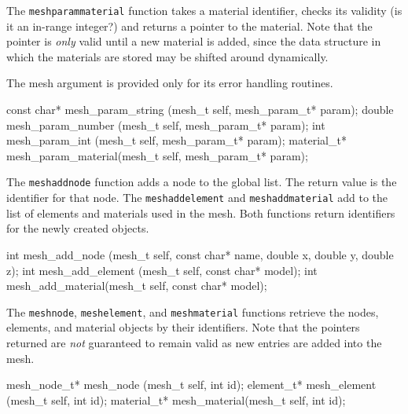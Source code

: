 The {\tt{}mesh{}param{}material} function takes a material identifier,
checks its validity (is it an in-range integer?) and returns a
pointer to the material.  Note that the pointer is \emph{only} valid
until a new material is added, since the data structure in which
the materials are stored may be shifted around dynamically.

The mesh argument is provided only for its error handling
routines.

\nwenddocs{}\plusendmoddef
const char*      mesh_param_string  (mesh_t self, mesh_param_t* param);
double           mesh_param_number  (mesh_t self, mesh_param_t* param);
int              mesh_param_int     (mesh_t self, mesh_param_t* param);
material_t*      mesh_param_material(mesh_t self, mesh_param_t* param);

\nwendcode{}\nwdocspar

The {\tt{}mesh{}add{}node} function adds a node to the global list.
The return value is the identifier for that node.
The {\tt{}mesh{}add{}element} and {\tt{}mesh{}add{}material} add to the list of
elements and materials used in the mesh.  Both functions return
identifiers for the newly created objects.

\nwenddocs{}\plusendmoddef
int mesh_add_node    (mesh_t self, const char* name, 
                      double x, double y, double z);
int mesh_add_element (mesh_t self, const char* model);
int mesh_add_material(mesh_t self, const char* model);

\nwendcode{}\nwdocspar

The {\tt{}mesh{}node}, {\tt{}mesh{}element}, and {\tt{}mesh{}material} functions
retrieve the nodes, elements, and material objects by their
identifiers.  Note that the pointers returned are \emph{not} guaranteed
to remain valid as new entries are added into the mesh.

\nwenddocs{}\plusendmoddef
mesh_node_t*  mesh_node    (mesh_t self, int id);
element_t*    mesh_element (mesh_t self, int id);
material_t*   mesh_material(mesh_t self, int id);

